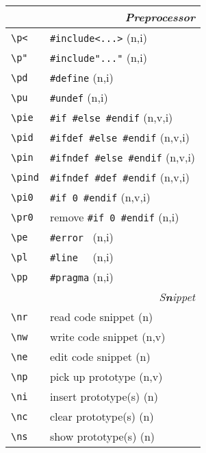 \documentclass[oneside,10pt,landscape,DIV16]{scrartcl}
\begin{document}
\begin{multicols}{3}
\begin{center}
\begin{tabular}[]{|p{11mm}|p{58mm}|}
\hline
\multicolumn{2}{|r|}{\textsl{\textbf{P}reprocessor}}   \\
\hline \verb'\p<'   & \verb$#include<...>$         \hfill (n,i)\\
\hline \verb'\p"'   & \verb$#include"..."$         \hfill (n,i)\\
\hline \verb'\pd'   & \verb'#define'               \hfill (n,i)\\
\hline \verb'\pu'   & \verb'#undef'                \hfill (n,i)\\
\hline \verb'\pie'  & \verb'#if #else #endif'      \hfill (n,v,i)\\
\hline \verb'\pid'  & \verb'#ifdef #else #endif'   \hfill (n,v,i)\\
\hline \verb'\pin'  & \verb'#ifndef #else #endif'  \hfill (n,v,i)\\
\hline \verb'\pind' & \verb'#ifndef #def #endif'   \hfill (n,v,i)\\
\hline \verb'\pi0'  & \verb'#if 0 #endif'          \hfill (n,v,i)\\
\hline \verb'\pr0'  & remove \verb'#if 0 #endif'   \hfill (n,i)\\
\hline \verb'\pe'   & \verb'#error '               \hfill (n,i)\\
\hline \verb'\pl'   & \verb'#line  '               \hfill (n,i)\\
\hline \verb'\pp'   & \verb'#pragma'               \hfill (n,i)\\
\hline
\hline 
\multicolumn{2}{|r|}{\textsl{S\textbf{n}ippet}} \\
\hline \verb'\nr'  & read code snippet         \hfill (n)\\
\hline \verb'\nw'  & write code snippet        \hfill (n,v)\\
\hline \verb'\ne'  & edit code snippet         \hfill (n)\\
\hline \verb'\np'  & pick up prototype         \hfill (n,v)\\
\hline \verb'\ni'  & insert prototype(s)       \hfill (n)\\
\hline \verb'\nc'  & clear  prototype(s)       \hfill (n)\\
\hline \verb'\ns'  & show   prototype(s)       \hfill (n)\\

\end{tabular}
\end{center}
\end{multicols}
\end{document}
